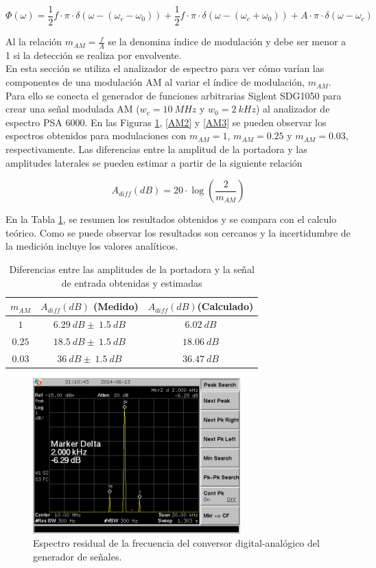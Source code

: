 \documentclass[a4paper,10pt]{article}
\begin{document}
		$$\Phi(\omega)=\frac{1}{2}f\cdot\pi\cdot\delta(\omega-(\omega_c-\omega_0
		))+\frac{1}{2}f\cdot\pi\cdot\delta(\omega-(\omega_c+\omega_0))+A\cdot\pi
		\cdot\delta(\omega-\omega_c)$$
		
		\indent Al la relaci\'on $m_{AM}=\frac{f}{A}$ se la denomina \'indice de
		modulaci\'on y debe ser menor a 1 si la detecci\'on se realiza por 
		envolvente. \\
		\indent En esta secci\'on se utiliza el analizador de espectro para ver 
		c\'omo var\'ian las componentes de una modulaci\'on AM al variar el 
		\'indice de modulaci\'on, $m_{AM}$. Para ello se conecta el generador de
		funciones arbitrarias Siglent SDG1050 para crear una se\~nal modulada AM
		($w_c=10~MHz$ y $w_0=2~kHz$) al analizador de espectro PSA 6000. En las
		Figuras \ref{AM1}, \ref{AM2} y \ref{AM3} se pueden observar los 
		espectros obtenidos para modulaciones con $m_{AM}=1$, $m_{AM}=0.25$ y 
		$m_{AM}=0.03$, respectivamente. Las diferencias entre la amplitud de la 
		portadora y las amplitudes laterales se pueden estimar a partir de la 
		siguiente relaci\'on

		$$A_{diff}(dB)=20\cdot\log(\frac{2}{m_{AM}})$$
		
		\indent En la Tabla \ref{AM}, se resumen los resultados obtenidos y se 
		compara con el calculo te\'orico. Como se puede observar los resultados 
		son cercanos y la incertidumbre de la medici\'on incluye los valores 
		anal\'iticos.
		
		\begin{table}[!htp]
			\centering
			\begin{tabular}{|c|c|c|}
				\hline
				$m_{AM}$ & $A_{diff}(dB)$ (Medido) & $A_{diff}(dB)$(Calculado)\\
				\hline
				$1$ & $6.29~dB\pm~1.5~dB$& $6.02~dB$ \\
				\hline
				$0.25$ & $18.5~dB\pm~1.5~dB$& $18.06~dB$ \\
				\hline
				$0.03$ & $36~dB\pm~1.5~dB$& $36.47~dB$
			\end{tabular}
			\caption{Diferencias entre las amplitudes de la portadora y la 
			se\~nal de entrada obtenidas y estimadas} \label{AM}
		\end{table}	
		
		\begin{figure}[!htb]
				\centering
				\includegraphics[width=8cm]
				{Imagenes/SCREN456.png}
				\caption{Espectro residual de la frecuencia del conversor 
				digital-anal\'ogico del generador de se\~nales.}
				\label{AM1} 
		\end{figure}
\end{document}
